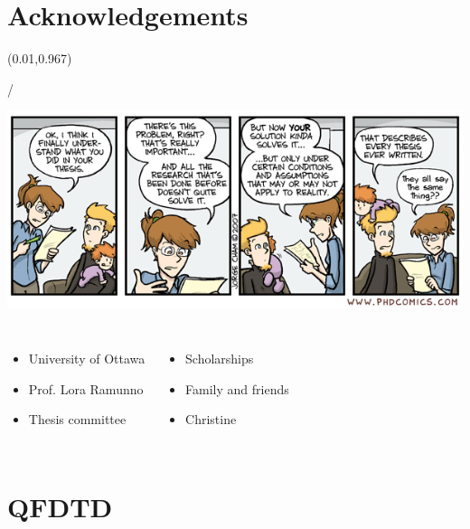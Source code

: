 \documentclass{beamer}
\makeatletter
\newcommand{\framenumber}{
\begin{textblock}{0}(0.01,0.967)
\begin{scriptsize}
{\color{gray}\insertframenumber/\inserttotalframenumber}
\end{scriptsize}
\end{textblock}
}
\makeatother
\begin{document}
\section*{Acknowledgements}
\begin{frame}{}\framenumber

\includegraphics[width=\textwidth]{figures/phd052107s}

\begin{columns}[t]

\begin{itemize}
\item University of Ottawa
\item Prof. Lora Ramunno
\item Thesis committee
\end{itemize}

\begin{itemize}
\item Scholarships
\item Family and friends
\item Christine
\end{itemize}

\end{columns}
\end{frame}






\appendix


\section{QFDTD}
\end{document}
